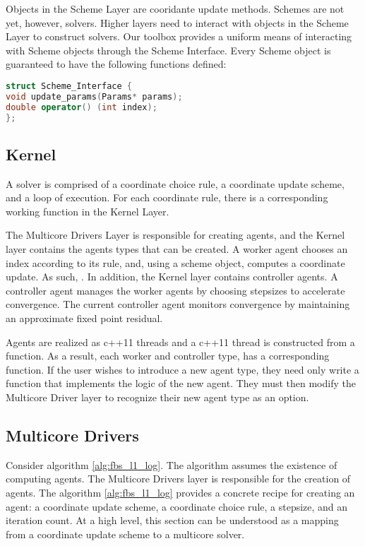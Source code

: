 Objects in the Scheme Layer are cooridante update methods.
Schemes are not yet, however, solvers.
Higher layers need to interact with objects in the Scheme Layer to construct solvers.
Our toolbox provides a uniform means of interacting with Scheme objects through the Scheme Interface.
Every Scheme object is guaranteed to have the following functions defined:

\begin{lstlisting}[language=C++]
struct Scheme_Interface {
void update_params(Params* params);
double operator() (int index);
};
\end{lstlisting}

\subsection{Kernel}

A solver is comprised of a coordinate choice rule, a coordinate update scheme, and a loop of execution.
For each coordinate rule, there is a corresponding working function in the Kernel Layer.

The Multicore Drivers Layer is responsible for creating agents, and the Kernel layer contains the agents types that can be created.
A worker agent chooses an index according to its rule, and, using a scheme object, computes a coordinate update.
As such, .
In addition, the Kernel layer contains controller agents.
A controller agent manages the worker agents by choosing stepsizes to accelerate convergence.
The current controller agent monitors convergence by maintaining an approximate fixed point residual.

Agents are realized as c++11 threads and a c++11 thread is constructed from a function.
As a result, each worker and controller type, has  a corresponding function.
If the user wishes to introduce a new agent type, they need only write a function that implements the logic of the new agent.
They must then modify the Multicore Driver layer to recognize their new agent type as an option.




\subsection{Multicore Drivers}


Consider algorithm \ref{alg:fbs_l1_log}.
 The algorithm assumes the existence of computing agents.
The Multicore Drivers  layer is responsible for the creation of agents.
The  algorithm \ref{alg:fbs_l1_log} provides a concrete recipe for creating an agent: a coordinate update scheme, a coordinate choice rule, a stepsize, and an iteration count.
At a high level, this section can be understood as a mapping from a coordinate update scheme to a multicore solver.

